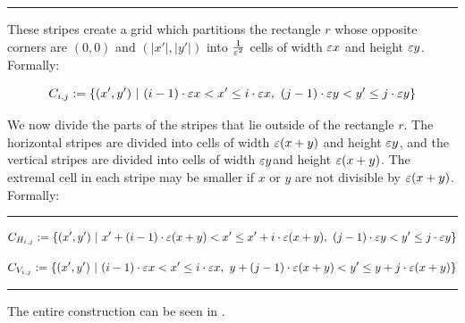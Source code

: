 \documentclass[12pt]{article}%
\begin{document}
\hrule

These stripes create a grid which partitions the rectangle $r$ whose
opposite corners are $(0,0)$ and $(|x'|,|y'|)$ into $\frac{1}{\varepsilon^2}$
cells of width $\varepsilon x$ and height $\varepsilon y$. Formally:

\begin{equation}
    C_{i,j}:=\{(x',y')~|~  (i-1)\cdot \varepsilon x < x' \leq i\cdot \varepsilon x,~
    (j-1)\cdot \varepsilon y< y' \leq j\cdot \varepsilon y\}
\end{equation}

We now divide the parts of the stripes that lie outside of the
rectangle $r$. The horizontal stripes are divided into cells of width
$\varepsilon(x+y)$ and height $\varepsilon y$, and the vertical stripes are divided
into cells of width $\varepsilon y$and height $\varepsilon(x+y)$. The extremal cell
in each stripe may be smaller if $x$ or $y$ are not divisible by
$\varepsilon(x+y)$. Formally:

\hrule

\begin{equation}
    C_{H_{i,j}}:=\{(x',y')~|~  x' + (i-1)\cdot \varepsilon (x+y) < x' \leq x'
    + i\cdot \varepsilon (x+y),~ (j-1)\cdot \varepsilon y< y' \leq j\cdot \varepsilon y\}
\end{equation}

\begin{equation}
    C_{V_{i,j}}:=\{(x',y')~|~  (i-1)\cdot \varepsilon x < x' \leq i\cdot \varepsilon
    x,~ y + (j-1)\cdot \varepsilon (x+y)< y' \leq y + j\cdot \varepsilon (x+y)\}
\end{equation}

\hrule

The entire construction can be seen in .
\end{document}
